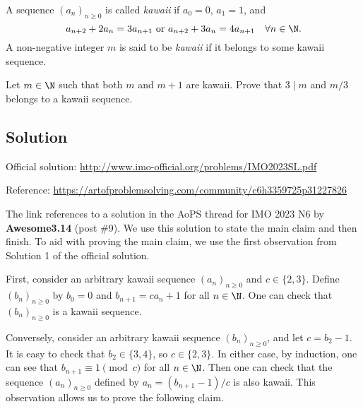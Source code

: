 A sequence $(a_n)_{n \geq 0}$ is called \emph{kawaii} if $a_0 = 0$, $a_1 = 1$, and
\[ a_{n + 2} + 2 a_n = 3 a_{n + 1} \text{ or } a_{n + 2} + 3 a_n = 4 a_{n + 1} \quad \forall n \in \N. \]
A non-negative integer $m$ is said to be \emph{kawaii} if it belongs to some kawaii sequence.

Let $m \in \N$ such that both $m$ and $m + 1$ are kawaii.
Prove that $3 \mid m$ and $m/3$ belongs to a kawaii sequence.



\subsection*{Solution}

Official solution: \url{http://www.imo-official.org/problems/IMO2023SL.pdf}

Reference: \url{https://artofproblemsolving.com/community/c6h3359725p31227826}

The link references to a solution in the AoPS thread for IMO 2023 N6 by \textbf{Awesome3.14} (post \#9).
We use this solution to state the main claim and then finish.
To aid with proving the main claim, we use the first observation from Solution 1 of the official solution.

First, consider an arbitrary kawaii sequence $(a_n)_{n \geq 0}$ and $c \in \{2, 3\}$.
Define $(b_n)_{n \geq 0}$ by $b_0 = 0$ and $b_{n + 1} = c a_n + 1$ for all $n \in \N$.
One can check that $(b_n)_{n \geq 0}$ is a kawaii sequence.

Conversely, consider an arbitrary kawaii sequence $(b_n)_{n \geq 0}$, and let $c = b_2 - 1$.
It is easy to check that $b_2 \in \{3, 4\}$, so $c \in \{2, 3\}$.
In either case, by induction, one can see that $b_{n + 1} \equiv 1 \pmod{c}$ for all $n \in \N$.
Then one can check that the sequence $(a_n)_{n \geq 0}$ defined by $a_n = (b_{n + 1} - 1)/c$ is also kawaii.
This observation allows us to prove the following claim.

